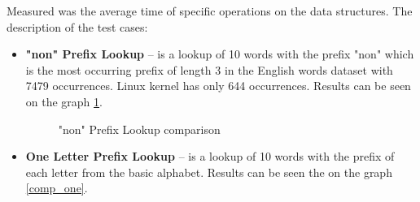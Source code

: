 
Measured was the average time of specific operations on the data structures.
The description of the test cases:
\begin{itemize}
    \item \textbf{"non" Prefix Lookup} – is a lookup of 10 words with the prefix "non" which is the most occurring prefix
    of length 3 in the English words dataset with 7479 occurrences. Linux kernel has only 644 occurrences. Results can be seen
    on the graph \ref{comp_non}.

    \begin{figure}[htbp]
        \centering
        \caption{"non" Prefix Lookup comparison}
        \label{comp_non}
    \end{figure}
    \item \textbf{One Letter Prefix Lookup} – is a lookup of 10 words with the prefix of each letter from the basic alphabet.
    Results can be seen the on the graph \ref{comp_one}.


\end{itemize}
